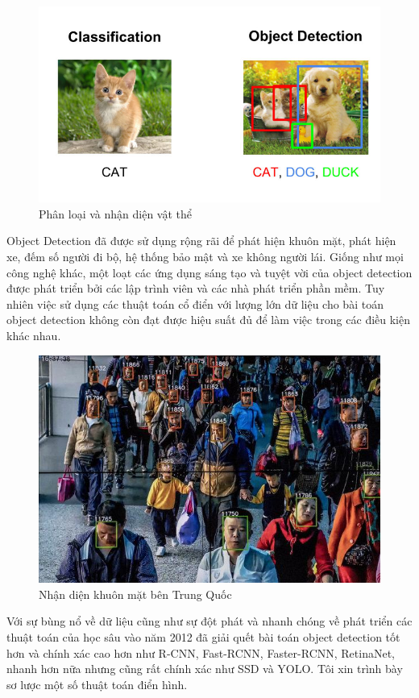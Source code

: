 \begin{figure}[H]
\begin{center}
\includegraphics[scale=0.5]{chap4/image/classificationAndetection.png}
\end{center}
\caption{Phân loại và nhận diện vật thể}
\end{figure}
Object Detection đã được sử dụng rộng rãi để phát hiện khuôn mặt, phát hiện xe, đếm số người đi bộ, hệ thống bảo mật và xe không người lái. Giống như mọi công nghệ khác, một loạt các ứng dụng sáng tạo và tuyệt vời của object detection được phát triển bởi các lập trình viên và các nhà phát triển phần mềm. Tuy nhiên việc sử dụng các thuật toán cổ điển với lượng lớn dữ liệu cho bài toán object detection không còn đạt được hiệu suất đủ để làm việc trong các điều kiện khác nhau.\par
\begin{figure}[H]
\begin{center}
\includegraphics[scale=0.5]{chap4/image/faceDetectionChina.jpg}
\end{center}
\caption{Nhận diện khuôn mặt bên Trung Quốc}
\end{figure}
Với sự bùng nổ về dữ liệu cũng như sự đột phát và nhanh chóng về phát triển các thuật toán của học sâu vào năm 2012 đã giải quết bài toán object detection tốt hơn và chính xác cao hơn như R-CNN, Fast-RCNN, Faster-RCNN, RetinaNet, nhanh hơn nữa nhưng cũng rất chính xác như SSD và YOLO. Tôi xin trình bày sơ lược một số thuật toán điển hình.
